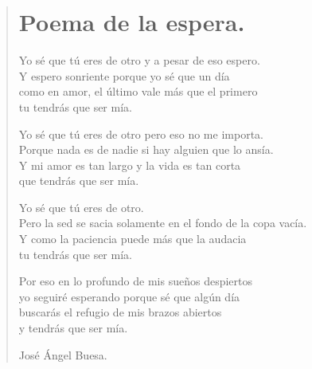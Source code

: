 \documentclass[11pt, portrait, twoside, notitlepage, openright]{book}
\begin{document}
\newpage
\begin{verse}
\begin{center}
\section{Poema de la espera.}
\end{center}
Yo sé que tú eres de otro y a pesar de eso espero.\\
Y espero sonriente porque yo sé que un día\\
como en amor, el último vale más que el primero\\
tu tendrás que ser mía.
\newline

Yo sé que tú eres de otro pero eso no me importa.\\
Porque nada es de nadie si hay alguien que lo ansía.\\
Y mi amor es tan largo y la vida es tan corta\\
que tendrás que ser mía.
\newline

Yo sé que tú eres de otro.\\
Pero la sed se sacia solamente en el fondo de la copa vacía.\\
Y como la paciencia puede más que la audacia\\
tu tendrás que ser mía.
\newline

Por eso en lo profundo de mis sueños despiertos\\
yo seguiré esperando porque sé que algún día\\
buscarás el refugio de mis brazos abiertos\\
y tendrás que ser mía.
\newline

José Ángel Buesa.
\end{verse}
\end{document}
